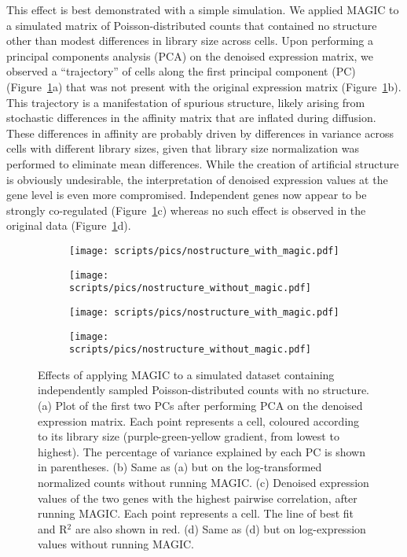 \documentclass[10pt,letterpaper]{article}
\begin{document}
This effect is best demonstrated with a simple simulation.
We applied MAGIC to a simulated matrix of Poisson-distributed counts that contained no structure other than modest differences in library size across cells.
Upon performing a principal components analysis (PCA) on the denoised expression matrix, we observed a ``trajectory'' of cells along the first principal component (PC) (Figure~\ref{fig:nostructure}a) that was not present with the original expression matrix (Figure~\ref{fig:nostructure}b).
This trajectory is a manifestation of spurious structure, likely arising from stochastic differences in the affinity matrix that are inflated during diffusion.
These differences in affinity are probably driven by differences in variance across cells with different library sizes, given that library size normalization was performed to eliminate mean differences.
While the creation of artificial structure is obviously undesirable, the interpretation of denoised expression values at the gene level is even more compromised.
Independent genes now appear to be strongly co-regulated (Figure~\ref{fig:nostructure}c) whereas no such effect is observed in the original data (Figure~\ref{fig:nostructure}d).

\begin{figure}[btp]
\centering
\begin{subfigure}[b]{0.49\textwidth}
    \texttt{[image: scripts/pics/nostructure\_with\_magic.pdf]}
    \caption{}
\end{subfigure}
\begin{subfigure}[b]{0.49\textwidth}
    \texttt{[image: scripts/pics/nostructure\_without\_magic.pdf]}
    \caption{}
\end{subfigure}
\begin{subfigure}[b]{0.49\textwidth}
    \texttt{[image: scripts/pics/nostructure\_with\_magic.pdf]}
    \caption{}
\end{subfigure}
\begin{subfigure}[b]{0.49\textwidth}
    \texttt{[image: scripts/pics/nostructure\_without\_magic.pdf]}
    \caption{}
\end{subfigure}
\caption{Effects of applying MAGIC to a simulated dataset containing independently sampled Poisson-distributed counts with no structure.
(a) Plot of the first two PCs after performing PCA on the denoised expression matrix.
Each point represents a cell, coloured according to its library size (purple-green-yellow gradient, from lowest to highest).
The percentage of variance explained by each PC is shown in parentheses.
(b) Same as (a) but on the log-transformed normalized counts without running MAGIC.
(c) Denoised expression values of the two genes with the highest pairwise correlation, after running MAGIC.
Each point represents a cell.
The line of best fit and R$^2$ are also shown in red.
(d) Same as (d) but on log-expression values without running MAGIC.}
\label{fig:nostructure}
\end{figure}
\end{document}
